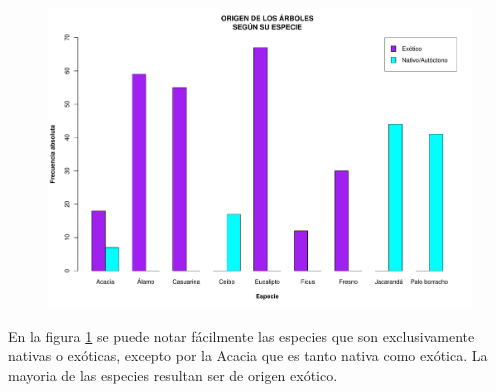 \documentclass[11pt]{article}
\begin{document}
\begin{figure}[h!]
  \begin{center}
    \includegraphics[width=0.9\linewidth]{barrasOrigenEspecie.pdf}
    \caption{}
    \label{fig:barrasOrigenEspecie}
  \end{center}  
\end{figure}

\begin{justify}
  En la figura \ref{fig:barrasOrigenEspecie} se puede notar fácilmente
  las especies que son exclusivamente nativas o exóticas, excepto por la Acacia
  que es tanto nativa como exótica. La mayoria de las especies resultan ser
  de origen exótico.
\end{justify}
\end{document}
